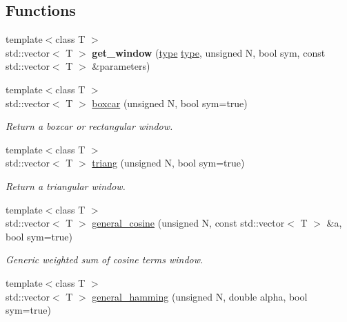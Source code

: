 \subsection*{Functions}
\begin{DoxyCompactItemize}
\item 
\mbox{\label{namespacedsp_1_1window_ae2b71102e5469df36d24f1a05bd402b4}} 
{\footnotesize template$<$class T $>$ }\\std\+::vector$<$ T $>$ {\bfseries get\+\_\+window} (\mbox{\hyperlink{namespacedsp_1_1window_a1cc0dcec4aa9e12640771bdf41f695b8}{type}} \mbox{\hyperlink{namespacedsp_1_1window_a1cc0dcec4aa9e12640771bdf41f695b8}{type}}, unsigned N, bool sym, const std\+::vector$<$ T $>$ \&parameters)
\item 
{\footnotesize template$<$class T $>$ }\\std\+::vector$<$ T $>$ \mbox{\hyperlink{namespacedsp_1_1window_aec4906fe8edc6620afbd2dd12fa5fa0d}{boxcar}} (unsigned N, bool sym=true)
\begin{DoxyCompactList}\small\item\em Return a boxcar or rectangular window. \end{DoxyCompactList}\item 
{\footnotesize template$<$class T $>$ }\\std\+::vector$<$ T $>$ \mbox{\hyperlink{namespacedsp_1_1window_a931f388022b655420037a5e1652621d8}{triang}} (unsigned N, bool sym=true)
\begin{DoxyCompactList}\small\item\em Return a triangular window. \end{DoxyCompactList}\item 
{\footnotesize template$<$class T $>$ }\\std\+::vector$<$ T $>$ \mbox{\hyperlink{namespacedsp_1_1window_ad79b183426c99214ead4f2f88670f28b}{general\+\_\+cosine}} (unsigned N, const std\+::vector$<$ T $>$ \&a, bool sym=true)
\begin{DoxyCompactList}\small\item\em Generic weighted sum of cosine terms window. \end{DoxyCompactList}\item 
\mbox{\label{namespacedsp_1_1window_aed7ecc2ad5ace3dbcac015ea224127a6}} 
{\footnotesize template$<$class T $>$ }\\std\+::vector$<$ T $>$ \mbox{\hyperlink{namespacedsp_1_1window_aed7ecc2ad5ace3dbcac015ea224127a6}{general\+\_\+hamming}} (unsigned N, double alpha, bool sym=true)

\end{DoxyCompactItemize}
